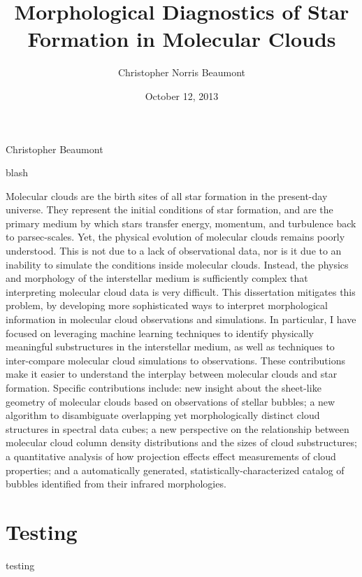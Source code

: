 \documentclass[]{uhthesis}
\begin{document}
\frontmatter

\title{Morphological Diagnostics of Star Formation in Molecular Clouds}
\author{Christopher Norris Beaumont}
\date{October 12, 2013}
\maketitle
\makesig
{}
{Christopher Beaumont}

\makeacknowledgements
blash

\makeabstract
Molecular clouds are the birth sites of all star formation in the present-day universe. They represent the initial conditions of star formation, and are the primary medium by which stars transfer energy, momentum, and turbulence back to parsec-scales. Yet, the physical evolution of molecular clouds remains poorly understood. This is not due to a lack of observational data, nor is it due to an inability to simulate the conditions inside molecular clouds. Instead, the physics and morphology of the interstellar medium is sufficiently complex that interpreting molecular cloud data is very difficult. This dissertation mitigates this problem, by developing more sophisticated ways to interpret morphological information in molecular cloud observations and simulations. In particular, I have focused on leveraging machine learning techniques to identify physically meaningful substructures in the interstellar medium, as well as techniques to inter-compare molecular cloud simulations to observations.  These contributions make it easier to understand the interplay between molecular clouds and star formation. Specific contributions include: new insight about the sheet-like geometry of molecular clouds based on observations of stellar bubbles; a new algorithm to disambiguate overlapping yet morphologically distinct cloud structures in spectral data cubes; a new perspective on the relationship between molecular cloud column density distributions and the sizes of cloud substructures; a quantitative analysis of how projection effects effect measurements of cloud properties; and a automatically generated, statistically-characterized catalog of bubbles identified from their infrared morphologies.

\tableofcontents
\listoftables
\listoffigures

\mainmatter


\chapter{Testing}
testing
\end{document}
